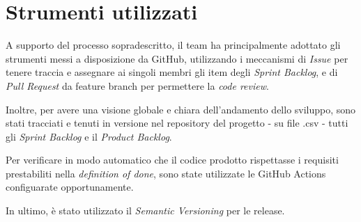 \section{Strumenti utilizzati}\label{sec:strumenti-utilizzati}
A supporto del processo sopradescritto, il team ha principalmente adottato gli strumenti messi a disposizione da GitHub, utilizzando i meccanismi di \textit{Issue} per
tenere traccia e assegnare ai singoli membri gli item degli \textit{Sprint Backlog}, e di \textit{Pull Request} da feature branch per permettere la \textit{code review}.

Inoltre, per avere una visione globale e chiara dell'andamento dello sviluppo, sono stati tracciati e tenuti in versione nel repository del progetto - su file .csv - tutti gli \textit{Sprint Backlog} e il \textit{Product Backlog}.

Per verificare in modo automatico che il codice prodotto rispettasse i requisiti prestabiliti nella \textit{definition of done}, sono state utilizzate le GitHub Actions configuarate opportunamente.

In ultimo, è stato utilizzato il \textit{Semantic Versioning} per le release.